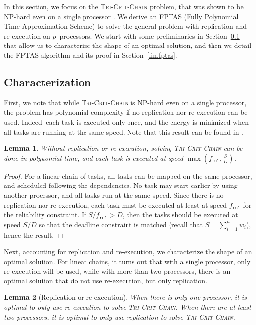 \documentclass[a4paper]{article}
\theoremstyle{plain}
\newtheorem{lemma}{Lemma}
\theoremstyle{definition}
\theoremstyle{remark}
\newcommand{\fr}{\ensuremath{f_{\texttt{rel}}}\xspace}
\newcommand{\chain}{\textsc{Tri-Crit-Chain}\xspace}
\begin{document}
In this section, we focus on the \chain problem, that was shown to be
NP-hard even on a single processor \cite{rr7757}. We derive an FPTAS
(Fully Polynomial Time Approximation Scheme) to sol\-ve the general
problem with replication and re-execution on $p$~processors. We start
with some preliminaries in Section~\ref{lin.char} that allow us to
characterize the shape of an optimal solution, and then we detail the
FPTAS algorithm and its proof in Section~\ref{lin.fptas}.


\subsection{Characterization}
\label{lin.char}


First, we note that while \chain is NP-hard even on a single
processor, the problem has polynomial complexity if no replication nor
re-execution can be used. Indeed, each task is executed only once, and
the energy is minimized when all tasks are running at the same speed. 
Note that this result can be found in \cite{aupy12ccpe}. 
\begin{lemma}
  \label{lemma_norel}
  Without replication or re-execution, solving \chain can be done 
  in polynomial time, and each task is
  executed at speed  $\max\left(\fr,\frac{S}{D}\right)$. 
\end{lemma}
\begin{proof}
  For a linear chain of tasks, all tasks can be mapped on the same
  processor, and scheduled following the dependencies. No task may
  start earlier by using another processor, and all tasks run at the
  same speed. Since there is no replication nor re-execution, each
  task must be executed at least at speed \fr for the reliability
  constraint. If $S/\fr>D$, then the tasks should be executed at speed
  $S/D$ so that the deadline constraint is matched (recall that
  $S=\sum_{i=1}^n w_i$), hence the result. 
\end{proof}

Next, accounting for replication and re-execution, we characterize the
shape of an optimal solution. For linear chains, it turns out that
with a single processor, only re-execution will be used, while with
more than two processors, there is an optimal solution that do not use
re-execution, but only replication. 
\begin{lemma}[Replication or re-execution]
  \label{chain_reporreex}
  When there is only one processor, it is optimal to only use
  re-execu\-tion to solve \chain.  When there are
  at least two processors, it is optimal to only use replication to
  solve \chain.
\end{lemma}
\end{document}

